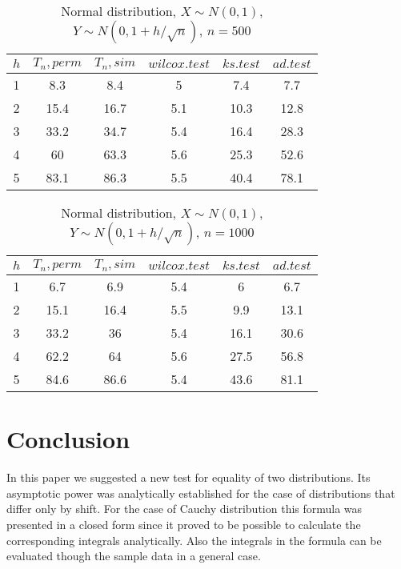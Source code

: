\documentclass{svproc}
\begin{document}
\begin{table}
  \caption{Normal distribution, $X\sim N(0,1)$, $Y\sim N(0, 1 + h/\sqrt{n})$, $n=500$}
  \begin{center}
  \begin{tabular}{c@{\quad}c@{\quad}c@{\quad}c@{\quad}c@{\quad}c}
  \hline
  $h$ & $T_n, perm$ & $T_n, sim$ & $wilcox.test$ & $ks.test$ & $ad.test$ \\
  \hline
  1 & 8.3 & 8.4 & 5 & 7.4 & 7.7\\
  2 & 15.4 & 16.7 & 5.1 & 10.3 & 12.8 \\
  3 & 33.2 & 34.7 & 5.4 & 16.4 & 28.3 \\
  4 & 60 & 63.3 & 5.6 & 25.3 & 52.6 \\
  5 & 83.1 & 86.3 & 5.5 & 40.4 & 78.1 \\
  \hline
  \end{tabular}
  \end{center}
\end{table}

\begin{table}
  \caption{Normal distribution, $X\sim N(0,1)$, $Y\sim N(0, 1 + h/\sqrt{n})$, $n=1000$}
  \begin{center}
  \begin{tabular}{c@{\quad}c@{\quad}c@{\quad}c@{\quad}c@{\quad}c}
  \hline
  $h$ & $T_n, perm$ & $T_n, sim$ & $wilcox.test$ & $ks.test$ & $ad.test$ \\
  \hline
  1 & 6.7 & 6.9 & 5.4 & 6 & 6.7 \\
  2 & 15.1 & 16.4 & 5.5 & 9.9 & 13.1 \\
  3 & 33.2 & 36 & 5.4 & 16.1 & 30.6 \\
  4 & 62.2 & 64 & 5.6 & 27.5 & 56.8 \\
  5 & 84.6 & 86.6 & 5.4 & 43.6 & 81.1 \\
  \hline
  \end{tabular}
  \end{center}
\end{table}





\section{Conclusion}
In this paper we suggested a new test for equality of two distributions. Its asymptotic power was analytically established for the case of distributions that differ only by shift. For the case of Cauchy distribution this formula was presented in a closed form  since it proved to be possible to calculate the corresponding integrals analytically. Also the integrals in the formula can be evaluated though the sample data in a general case.
\end{document}
